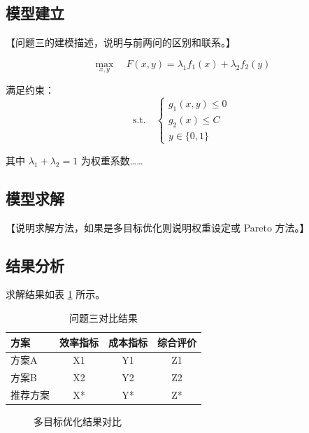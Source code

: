 \documentclass[withoutpreface,bwprint]{cumcmthesis}
\begin{document}
\subsection{模型建立}

【问题三的建模描述，说明与前两问的区别和联系。】

\begin{equation}
    \max_{x,y} \quad F(x,y) = \lambda_1 f_1(x) + \lambda_2 f_2(y)
    \label{eq:obj3}
\end{equation}

满足约束：
\begin{equation}
    \text{s.t.} \quad
    \begin{cases}
        g_1(x,y) \leq 0 \\
        g_2(x) \leq C   \\
        y \in \{0,1\}
    \end{cases}
    \label{eq:con3}
\end{equation}

其中 $\lambda_1 + \lambda_2 = 1$ 为权重系数……

\subsection{模型求解}

【说明求解方法，如果是多目标优化则说明权重设定或 Pareto 方法。】

\subsection{结果分析}

求解结果如表 \cref{tab:result3} 所示。

{\renewcommand{\arraystretch}{1.38}
\setlength{\tabcolsep}{6pt}
\begin{longtable}{lccc}
    \caption{问题三对比结果}\label{tab:result3}\\
    \toprule[1.5pt]
    方案   & 效率指标 & 成本指标 & 综合评价 \\
    \midrule[1pt]
    \endfirsthead
    \endhead
    \bottomrule[1.5pt]
    \endlastfoot
    方案A  & X1   & Y1   & Z1   \\
    方案B  & X2   & Y2   & Z2   \\
    推荐方案 & X*   & Y*   & Z*   \\
\end{longtable}}

\begin{figure}[H]
    \centering
    \caption{多目标优化结果对比}
    \label{fig:result3}
\end{figure}
\end{document}
